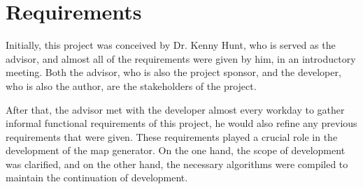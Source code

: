 \section{Requirements}
\label{sec:Requirements}
Initially, this project was conceived by Dr. Kenny Hunt, who is served as the advisor, and almost all of the requirements were given by him, in an introductory meeting. Both the advisor, who is also the project sponsor, and the developer, who is also the author, are the stakeholders of the project.

After that, the advisor met with the developer almost every workday to gather informal functional requirements of this project, he would also refine any previous requirements that were given. These requirements played a crucial role in the development of the map generator. On the one hand, the scope of development was clarified, and on the other hand, the necessary algorithms were compiled to maintain the continuation of development.

